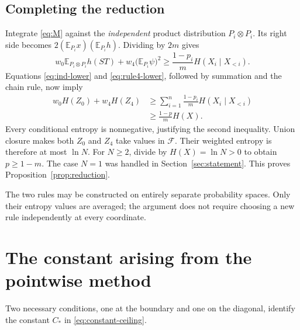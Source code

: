 \documentclass[11pt]{article}
\theoremstyle{remark}
\newcommand{\F}{\mathcal F}
\newcommand{\E}{\mathbb E}
\begin{document}
\subsection{Completing the reduction}
Integrate \eqref{eq:M} against the \emph{independent} product
distribution \(P_i\otimes P_i\). Its right side becomes
\(2(\E_{P_i}x)(\E_{P_i}h)\). Dividing by \(2m\) gives
\[
w_0\E_{P_i\otimes P_i}h(ST)
+w_4\bigl(\E_{P_i}\psi\bigr)^2
\ge\frac{1-p_i}{m}H(X_i\mid X_{<i}).
\]
Equations \eqref{eq:ind-lower} and \eqref{eq:rule4-lower}, followed
by summation and the chain rule, now imply
\begin{align*}
w_0H(Z_0)+w_4H(Z_4)
&\ge\sum_{i=1}^n\frac{1-p_i}{m}H(X_i\mid X_{<i})\\
&\ge\frac{1-p}{m}H(X).
\end{align*}
Every conditional entropy is nonnegative, justifying the second
inequality. Union closure makes both \(Z_0\) and \(Z_4\) take values
in \(\F\). Their weighted entropy is therefore at most \(\ln N\).
For \(N\ge2\), divide by \(H(X)=\ln N>0\) to obtain \(p\ge1-m\).
The case \(N=1\) was handled in Section~\ref{sec:statement}.
This proves Proposition~\ref{prop:reduction}.

The two rules may be constructed on entirely separate probability
spaces. Only their entropy values are averaged; the argument does
not require choosing a new rule independently at every coordinate.


\section{The constant arising from the pointwise method}
\label{sec:ceiling}

Two necessary conditions, one at the boundary and one on the diagonal,
identify the constant \(C_*\) in \eqref{eq:constant-ceiling}.
\end{document}
